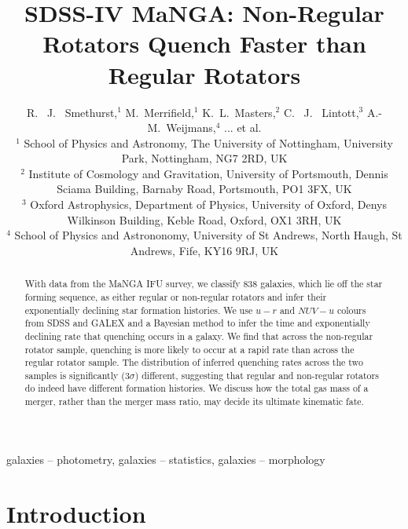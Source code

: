 \documentclass[useAMS,usenatbib]{mn2e}
\begin{document}
\title[Quenching Histories of Regular and Non-Regular Rotators]{SDSS-IV MaNGA: Non-Regular Rotators Quench Faster than Regular Rotators}
\author[Smethurst et al. 2017]{R. ~J. ~Smethurst,$^{1}$ M.~Merrifield,$^{1}$ K.~L.~Masters,$^{2}$  C. ~J. ~Lintott,$^{3}$ \newauthor A.-M.~Weijmans,$^{4}$ ... et al.
\\ $^1$ School of Physics and Astronomy, The University of Nottingham, University Park, Nottingham, NG7 2RD, UK
\\ $^2$ Institute of Cosmology and Gravitation, University of Portsmouth, Dennis Sciama Building, Barnaby Road, Portsmouth, PO1 3FX, UK 
\\ $^3$ Oxford Astrophysics, Department of Physics, University of Oxford, Denys Wilkinson Building, Keble Road, Oxford, OX1 3RH, UK
\\ $^4$ School of Physics and Astrononomy, University of St Andrews, North Haugh, St Andrews, Fife, KY16 9RJ, UK
}

\maketitle

\begin{abstract}
With data from the MaNGA IFU survey, we classify $838$ galaxies, which lie off the star forming sequence, as either regular or non-regular rotators and infer their exponentially declining star formation histories. We use $u-r$ and $NUV-u$ colours from SDSS and GALEX and a Bayesian method to infer the time and exponentially declining rate that quenching occurs in a galaxy. We find that across the non-regular rotator sample, quenching is more likely to occur at a rapid rate than across the regular rotator sample. The distribution of inferred quenching rates across the two samples is significantly ($3\sigma$) different, suggesting that regular and non-regular rotators do indeed have different formation histories. We discuss how the total gas mass of a merger, rather than the merger mass ratio,	 may decide its ultimate kinematic fate. 
\end{abstract}

\begin{keywords}
galaxies -- photometry, galaxies -- statistics, galaxies -- morphology
\end{keywords}

\section{Introduction}\label{sec:intro}
\end{document}
